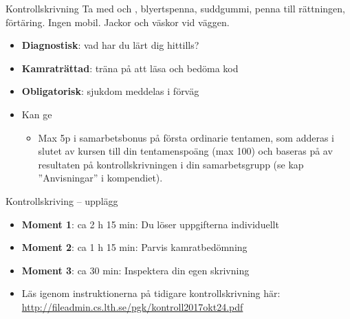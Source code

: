 


\begin{Slide}{Kontrollskrivning}
Ta med  och , blyertspenna, suddgummi,  penna till rättningen, förtäring. Ingen mobil. Jackor och väskor vid väggen.
\begin{itemize}
  \item \textbf{Diagnostisk}: vad har du lärt dig hittills?
  \item \textbf{Kamraträttad}: träna på att läsa och bedöma kod
  \item \textbf{Obligatorisk}: sjukdom  meddelas i förväg
  \item Kan ge  
  \begin{itemize}
    \item[] Max 5p i samarbetsbonus på första ordinarie tentamen, som adderas i slutet av kursen till din tentamenspoäng (max 100) och baseras på  av resultaten på kontrollskrivningen i din samarbetsgrupp (se kap ''Anvisningar'' i kompendiet).
  \end{itemize}
\end{itemize}
\end{Slide}

\begin{Slide}{Kontrollskriving -- upplägg}\SlideFontSmall
\begin{itemize}
  \item \textbf{Moment 1}: ca 2 h 15 min: Du löser uppgifterna individuellt
  \item \textbf{Moment 2}: ca 1 h 15 min: Parvis kamratbedömning
  \item \textbf{Moment 3}: ca 30 min: Inspektera din egen skrivning

\item Läs  igenom instruktionerna på tidigare kontrollskrivning här: 
\url{http://fileadmin.cs.lth.se/pgk/kontroll2017okt24.pdf}

\end{itemize}


\end{Slide}

